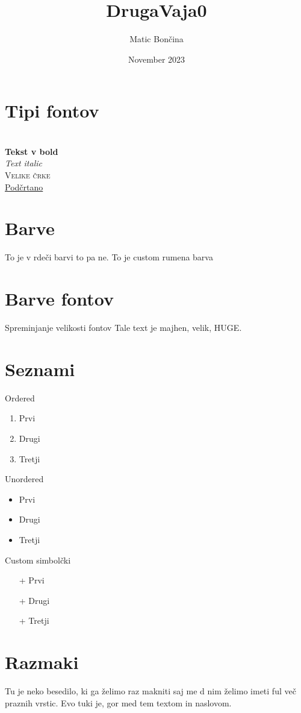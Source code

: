 \documentclass{article}
\title{DrugaVaja0}
\author{Matic Bončina}
\date{November 2023}
\begin{document}
\maketitle
\newpage

\section{Tipi fontov}\\
\textbf{Tekst v bold}\\
\textit{Text italic}\\
\textsc{Velike črke}\\
\underline{Podčrtano}\\

\section{Barve}
{\color{red}To je v rdeči barvi} to pa ne.
{\color{yellow}To je custom rumena barva}

\section{Barve fontov}
Spreminjanje velikosti fontov Tale text je {\small majhen}, {\large velik}, {\huge HUGE}.

\section{Seznami}
Ordered
\begin{enumerate}
    \item Prvi 
    \item Drugi
    \item Tretji
\end{enumerate}

Unordered
\begin{itemize}
    \item Prvi 
    \item Drugi
    \item Tretji
\end{itemize}

Custom simbolčki
\begin{itemize}
    \item[+] Prvi 
    \item[+] Drugi
    \item[+] Tretji
\end{itemize}

\newpage

\section{Razmaki}
\vspace{60pt}
Tu je neko besedilo, ki ga želimo raz makniti saj me d nim želimo imeti ful več praznih vrstic. Evo tuki je, gor med tem textom in naslovom.
\end{document}
